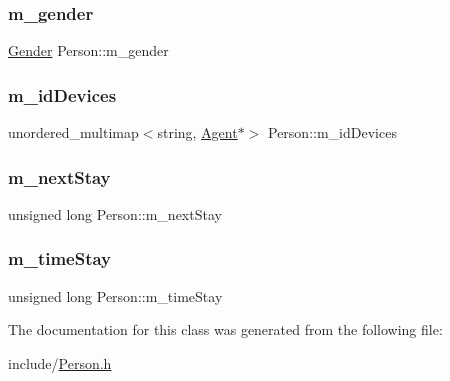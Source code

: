 \mbox{\label{class_person_ade9cdf49acde95c75f19f0b0d24c8c9a}} 
\subsubsection{\texorpdfstring{m\+\_\+gender}{m\_gender}}
{\footnotesize\ttfamily \hyperlink{class_person_aff84ca16bd4dbf364614d86f20b29dd2}{Gender} Person\+::m\+\_\+gender\hspace{0.3cm}{\ttfamily [private]}}

\mbox{\label{class_person_a95b2e60a54b72aea51a7600048e76291}} 
\subsubsection{\texorpdfstring{m\+\_\+id\+Devices}{m\_idDevices}}
{\footnotesize\ttfamily unordered\+\_\+multimap$<$string, \hyperlink{class_agent}{Agent}$\ast$$>$ Person\+::m\+\_\+id\+Devices\hspace{0.3cm}{\ttfamily [private]}}

\mbox{\label{class_person_ad8809184fc32b28b1bcc115b10493b55}} 
\subsubsection{\texorpdfstring{m\+\_\+next\+Stay}{m\_nextStay}}
{\footnotesize\ttfamily unsigned long Person\+::m\+\_\+next\+Stay\hspace{0.3cm}{\ttfamily [private]}}

\mbox{\label{class_person_a5554109f1f3a7c466f02346d0061c6e7}} 
\subsubsection{\texorpdfstring{m\+\_\+time\+Stay}{m\_timeStay}}
{\footnotesize\ttfamily unsigned long Person\+::m\+\_\+time\+Stay\hspace{0.3cm}{\ttfamily [private]}}



The documentation for this class was generated from the following file\+:\begin{DoxyCompactItemize}
\item 
include/\hyperlink{_person_8h}{Person.\+h}\end{DoxyCompactItemize}
